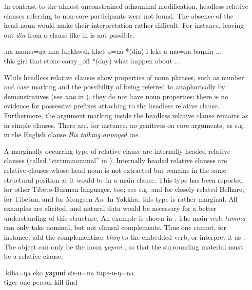 In contrast to the almost unconstrained adnominal modification, headless relative clauses referring to non-core participants were not found. The absence of the head noun would make their interpretation rather difficult. For instance, leaving out \emph{din}  from a clause like in \Next is not possible. 

\exg.na   mamu=ŋa   nna  luŋkhwak khet-u=na  *(din) i leks-a-ma=na  baŋniŋ ...\\
this girl that stone  carry\_off *(day) what happen about ...\\
 


While headless relative clauses show  properties of noun phrases, such as number and case marking and the possibility of being referred to anaphorically by demonstratives (see \emph{nna} in \LLast[a]), they do not have noun properties: there is  no evidence for possessive prefixes attaching to the headless relative clause. Furthermore, the argument marking inside the headless relative clause remains as in simple clauses. There are, for instance, no genitives on core arguments, as e.g. in the English clause \emph{His talking annoyed me}. 

A marginally occurring type of relative clause are internally headed relative clauses (called “circumnominal” in \citealt{Lehmann1984Der-Relativsatz}). Internally headed relative clauses are relative clauses whose head noun is not extracted but remains in the same structural position as it would be in a main clause. This type has been reported for other Tibeto-Burman languages, too; see e.g. \citet[3]{Bickel2005On-the-typological} and \cite{Bickel1999Nominalization} for closely related Belhare, \citet[245]{DeLancey1999Relativization} for Tibetan, and \citet[255]{Coupe2007_Mongsen} for Mongsen Ao. In Yakkha, this type is rather marginal. All examples are elicited, and natural data would be necessary for a better understanding of this structure. An example is shown in \Next. The main verb \emph{tumma}  can only take nominal, but not clausal complements. Thus one cannot, for instance, add the complementizer \emph{bhoŋ} to the embedded verb, or interpret it as . The object can only be the noun \emph{yapmi} , so that the surrounding material must be a relative clause.


\exg.kiba=ŋa  eko \textbf{yapmi} sis-u=na tups-u-ŋ=na\\
tiger one person kill find\\ 


